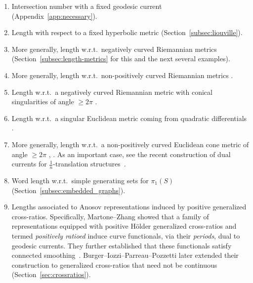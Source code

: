\begin{enumerate}
   \item Intersection number with a fixed geodesic current
     \cite[Proposition~4.5]{Bonahon86:EndsHyperbolicManifolds}
     (Appendix~\ref{app:necessary}).
   \item \label{item:metric-hyperbolic}\label{item:metric-first}
     Length with respect to a fixed hyperbolic metric
      \cite[Proposition~14]{Bonahon88:GeodesicCurrent}
      (Section~\ref{subsec:liouville}).
    \item More generally, length w.r.t.\ negatively curved Riemannian
      metrics \cite[Th\'eor\`eme~1]{Otal90:SpectreMarqueNegative}
      (Section~\ref{subsec:length-metrics} for this and the next
      several examples).
    \item More generally, length w.r.t.\ non-positively curved Riemannian metrics
\cite[Theorem~A]{CFF92:RigidityNonPosCurvedRiem}.
\item Length w.r.t.\ a negatively curved Riemannian metric with
  conical singularities of angle $\geq 2\pi$
  \cite[Theorem~A]{HP97:RigidityNegCurvedCone}.
\item Length w.r.t.\ a singular Euclidean metric coming from quadratic
  differentials \cite[Lemma~9]{DLR10:DegenerationFlatMetrics}.
\item \label{item:metric-last}
  More generally, length w.r.t.\ a non-positively curved Euclidean
  cone metric of angle $\geq 2\pi$
  \cite[Proposition~3.3]{BL17:RigidityFlat},
  \cite{Con18:MarkedNonpos}. As an important case, see the recent construction of dual currents for $\frac{1}{n}$-translation structures~\cite[Definition~2.2]{PS26:1ntranslation}.
\item \label{item:simple-gen}
  Word length w.r.t.\ simple generating sets for $\pi_1(S)$
  \cite[Theorem~1.2]{Erlandsson:WordLength}
  (Section~\ref{subsec:embedded_graphs}).
\item \label{item:positively-ratioed}
  Lengths associated to Anosov representations induced by positive
  generalized cross-ratios. Specifically,
  Martone--Zhang \cite[Proposition~2.24]{MZ19:PositivelyRatioed} showed that a family of representations equipped with positive H\"older generalized
cross-ratios and termed \emph{positively ratioed} induce curve
functionals, via their \emph{periods}, dual to geodesic currents. They further established that
these functionals satisfy connected smoothing~\cite[Proposition~4.5]{MZ19:PositivelyRatioed}.
Burger--Iozzi--Parreau--Pozzetti later extended their construction to
generalized cross-ratios that need not be continuous
\cite[Theorem~1.6]{BIPP24:PositiveCrossratios}
(Section~\ref{sec:crossratios}).
\end{enumerate}

